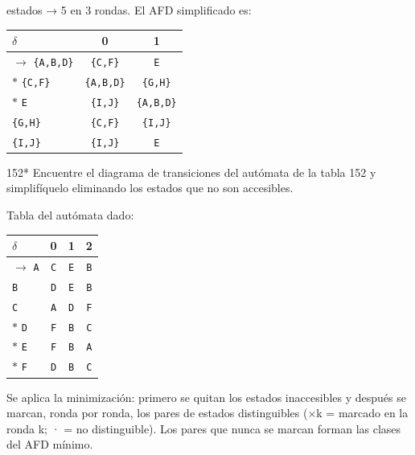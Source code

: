 \documentclass[11pt]{article}
\begin{document}
 estados → 5 en 3 rondas. El AFD simplificado es:
\begin{center}\small\begin{tabular}{lcc}\toprule
$\delta$ & 0 & 1 \\\midrule
$\to$ \texttt{\{A,B,D\}} & \texttt{\{C,F\}} & \texttt{E} \\
$*$ \texttt{\{C,F\}} & \texttt{\{A,B,D\}} & \texttt{\{G,H\}} \\
$*$ \texttt{E} & \texttt{\{I,J\}} & \texttt{\{A,B,D\}} \\
 \texttt{\{G,H\}} & \texttt{\{C,F\}} & \texttt{\{I,J\}} \\
 \texttt{\{I,J\}} & \texttt{\{I,J\}} & \texttt{E} \\
\bottomrule\end{tabular}\end{center}



\begin{ejercicio}{152}{*}
Encuentre el diagrama de transiciones del autómata de la tabla 152 y simplifíquelo eliminando los estados que no son accesibles.
\end{ejercicio}
\proc Tabla del autómata dado:
\begin{center}\small\begin{tabular}{lccc}\toprule
$\delta$ & 0 & 1 & 2 \\\midrule
$\to$ \texttt{A} & \texttt{C} & \texttt{E} & \texttt{B} \\
 \texttt{B} & \texttt{D} & \texttt{E} & \texttt{B} \\
 \texttt{C} & \texttt{A} & \texttt{D} & \texttt{F} \\
$*$ \texttt{D} & \texttt{F} & \texttt{B} & \texttt{C} \\
$*$ \texttt{E} & \texttt{F} & \texttt{B} & \texttt{A} \\
$*$ \texttt{F} & \texttt{D} & \texttt{B} & \texttt{C} \\
\bottomrule\end{tabular}\end{center}
Se aplica la minimización: primero se quitan los estados inaccesibles y después se marcan, ronda por ronda, los pares de estados distinguibles (×k = marcado en la ronda k; · = no distinguible). Los pares que nunca se marcan forman las clases del AFD mínimo.
\end{document}
